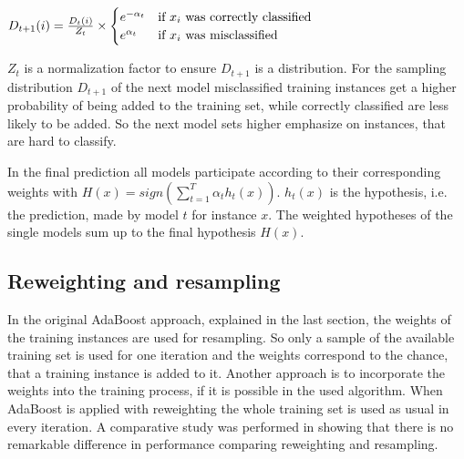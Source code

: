 \documentclass[10pt]{reportMaster}
\begin{document}
$ D_{t+1}(i) = \frac{D_t(i)}{Z_t} \times 
\begin{cases}
	e^{-\alpha_t} & \text{if $ x_i $ was correctly classified} \\ 
	e^{\alpha_t} & \text{if $ x_i $ was misclassified}
\end{cases}
$

$Z_t$ is a normalization factor to ensure $D_{t+1}$ is a distribution.
For the sampling distribution $D_{t+1}$ of the next model misclassified training instances get a higher probability of being added to the training set, while correctly classified are less likely to be added.
So the next model sets higher emphasize on instances, that are hard to classify.

In the final prediction all models participate according to their corresponding weights with $H(x) = sign(\sum_{t = 1}^T\alpha_th_t(x))$.
$h_t(x)$ is the hypothesis, i.e. the prediction, made by model $t$ for instance $x$.
The weighted hypotheses of the single models sum up to the final hypothesis $H(x)$. 


\subsection{Reweighting and resampling}
\label{sec:reweightingResampling}
In the original AdaBoost approach, explained in the last section, the weights of the training instances are used for resampling.
So only a sample of the available training set is used for one iteration and the weights correspond to the chance, that a training instance is added to it.
Another approach is to incorporate the weights into the training process, if it is possible in the used algorithm.
When AdaBoost is applied with reweighting the whole training set is used as usual in every iteration.
A comparative study was performed in \cite{resamplingReweighting} showing that there is no remarkable difference in performance comparing reweighting and resampling.
\end{document}
